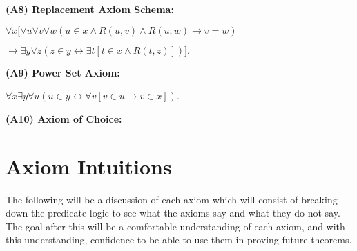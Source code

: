 \documentclass[12pt, a4paper]{article}
\begin{document}
\begin{description}
    \item\textbf{(A8) Replacement Axiom Schema: }\par\vspace{4mm}\centerline{$\forall x[\forall u\forall v\forall w(u\in x\wedge R(u,v)\wedge R(u,w)\rightarrow v=w)$}\par\centerline{$\rightarrow\exists y\forall z(z\in y\leftrightarrow\exists t[t\in x\wedge R(t,z)])].$}
    
    \item\textbf{(A9) Power Set Axiom: }\par\vspace{4mm}\centerline{$\forall x\exists y\forall u(u\in y\leftrightarrow\forall v[v\in u\rightarrow v\in x])$.}
    
    \item\textbf{(A10) Axiom of Choice: }\par\vspace{4mm}\centerline{}
    
\end{description}



\newpage

\section{Axiom Intuitions}

\noindent The following will be a discussion of each axiom which will consist of breaking down the predicate logic to see what the axioms say and what they do not say. The goal after this will be a comfortable understanding of each axiom, and with this understanding, confidence to be able to use them in proving future theorems.\par
\end{document}

